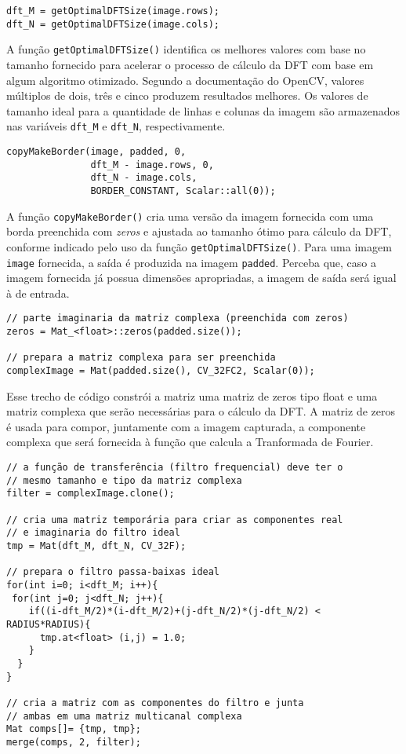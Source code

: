 \documentclass[11pt]{amsbook}
\begin{document}
\begin{verbatim}
dft_M = getOptimalDFTSize(image.rows);
dft_N = getOptimalDFTSize(image.cols);
\end{verbatim}

A função \texttt{getOptimalDFTSize()} identifica os melhores valores com base
no tamanho fornecido para acelerar o processo de cálculo da DFT com
base em algum algoritmo otimizado. Segundo a documentação do OpenCV,
valores múltiplos de dois, três e cinco produzem resultados
melhores. Os valores de tamanho ideal para a quantidade de linhas e
colunas da imagem são armazenados nas variáveis \texttt{dft_M} e \texttt{dft_N},
respectivamente.


\begin{verbatim}
copyMakeBorder(image, padded, 0,
               dft_M - image.rows, 0,
               dft_N - image.cols,
               BORDER_CONSTANT, Scalar::all(0));
\end{verbatim}

A função \texttt{copyMakeBorder()} cria uma versão da imagem fornecida com
uma borda preenchida com \emph{zeros} e ajustada ao tamanho ótimo para
cálculo da DFT, conforme indicado pelo uso da função
\texttt{getOptimalDFTSize()}. Para uma imagem \texttt{image} fornecida, a saída é
produzida na imagem \texttt{padded}. Perceba que, caso a imagem fornecida já
possua dimensões apropriadas, a imagem de saída será igual à de
entrada.


\begin{verbatim}
// parte imaginaria da matriz complexa (preenchida com zeros)
zeros = Mat_<float>::zeros(padded.size());

// prepara a matriz complexa para ser preenchida
complexImage = Mat(padded.size(), CV_32FC2, Scalar(0));
\end{verbatim}

Esse trecho de código constrói a matriz uma matriz de zeros tipo float
e uma matriz complexa que serão necessárias para o cálculo da DFT. A
matriz de zeros é usada para compor, juntamente com a imagem
capturada, a componente complexa que será fornecida à função que
calcula a Tranformada de Fourier.


\begin{verbatim}
// a função de transferência (filtro frequencial) deve ter o
// mesmo tamanho e tipo da matriz complexa
filter = complexImage.clone();

// cria uma matriz temporária para criar as componentes real
// e imaginaria do filtro ideal
tmp = Mat(dft_M, dft_N, CV_32F);

// prepara o filtro passa-baixas ideal
for(int i=0; i<dft_M; i++){
 for(int j=0; j<dft_N; j++){
    if((i-dft_M/2)*(i-dft_M/2)+(j-dft_N/2)*(j-dft_N/2) < RADIUS*RADIUS){
      tmp.at<float> (i,j) = 1.0;
    }
  }
}

// cria a matriz com as componentes do filtro e junta
// ambas em uma matriz multicanal complexa
Mat comps[]= {tmp, tmp};
merge(comps, 2, filter);
\end{verbatim}
\end{document}
